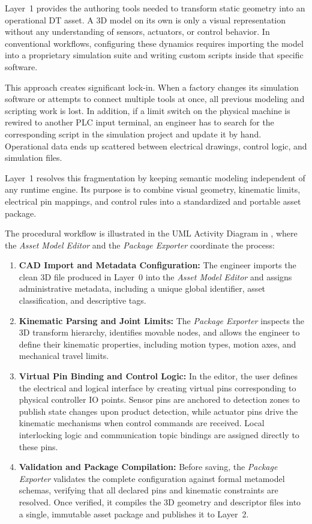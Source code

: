 Layer~1 provides the authoring tools needed to transform static geometry into an operational \gls{DT} asset. A 3D model on its own is only a visual representation without any understanding of sensors, actuators, or control behavior. In conventional workflows, configuring these dynamics requires importing the model into a proprietary simulation suite and writing custom scripts inside that specific software.

This approach creates significant lock-in. When a factory changes its simulation software or attempts to connect multiple tools at once, all previous modeling and scripting work is lost. In addition, if a limit switch on the physical machine is rewired to another \gls{PLC} input terminal, an engineer has to search for the corresponding script in the simulation project and update it by hand. Operational data ends up scattered between electrical drawings, control logic, and simulation files.

Layer~1 resolves this fragmentation by keeping semantic modeling independent of any runtime engine. Its purpose is to combine visual geometry, kinematic limits, electrical pin mappings, and control rules into a standardized and portable asset package. 

The procedural workflow is illustrated in the \gls{UML} Activity Diagram in , where the \textit{Asset Model Editor} and the \textit{Package Exporter} coordinate the process:
\begin{enumerate}
    \item \textbf{\gls{CAD} Import and Metadata Configuration:} The engineer imports the clean 3D file produced in Layer~0 into the \textit{Asset Model Editor} and assigns administrative metadata, including a unique global identifier, asset classification, and descriptive tags.
    \item \textbf{Kinematic Parsing and Joint Limits:} The \textit{Package Exporter} inspects the 3D transform hierarchy, identifies movable nodes, and allows the engineer to define their kinematic properties, including motion types, motion axes, and mechanical travel limits.
    \item \textbf{Virtual Pin Binding and Control Logic:} In the editor, the user defines the electrical and logical interface by creating virtual pins corresponding to physical controller \gls{IO} points. Sensor pins are anchored to detection zones to publish state changes upon product detection, while actuator pins drive the kinematic mechanisms when control commands are received. Local interlocking logic and communication topic bindings are assigned directly to these pins.
    \item \textbf{Validation and Package Compilation:} Before saving, the \textit{Package Exporter} validates the complete configuration against formal metamodel schemas, verifying that all declared pins and kinematic constraints are resolved. Once verified, it compiles the 3D geometry and descriptor files into a single, immutable asset package and publishes it to Layer~2.
\end{enumerate}

